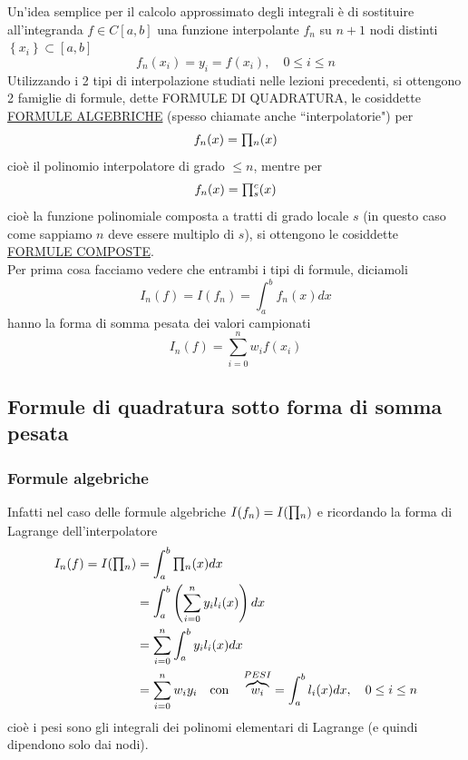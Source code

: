 Un'idea semplice per il calcolo approssimato degli integrali è di sostituire all'integranda $f \in C[a,b]$ una funzione interpolante $f_n$ su $n+1$ nodi distinti $\left\{x_i\right\} \subset [a,b]$
\begin{equation*}
    f_n(x_i) = y_i = f(x_i), \quad 0 \leq i \leq n
\end{equation*}
Utilizzando i 2 tipi di interpolazione studiati nelle lezioni precedenti, si ottengono 2 famiglie di formule, dette FORMULE DI QUADRATURA, le cosiddette \uline{FORMULE ALGEBRICHE} (spesso chiamate anche ``interpolatorie") per
\begin{equation*}
    f_n(x) = \begin{matrix}\prod\end{matrix}_n(x)
\end{equation*}
cioè il polinomio interpolatore di grado $\leq n$, mentre per 
\begin{equation*}
    f_n(x) = \begin{matrix}\prod\end{matrix}_s^c(x)
\end{equation*}
cioè la funzione polinomiale composta a tratti di grado locale $s$ (in questo caso come sappiamo $n$ deve essere multiplo di $s$), si ottengono le cosiddette \uline{FORMULE COMPOSTE}. \\
Per prima cosa facciamo vedere che entrambi i tipi di formule, diciamoli
\begin{equation*}
    I_n(f) = I(f_n) = \int_a^b f_n(x) dx
\end{equation*}
hanno la forma di somma pesata dei valori campionati
\begin{equation*}
    I_n(f) = \sum_{i=0}^n w_i f(x_i)
\end{equation*}

\subsection{Formule di quadratura sotto forma di somma pesata}
\subsubsection{Formule algebriche}
Infatti nel caso delle formule algebriche $I(f_n)=I(\begin{matrix}\prod\end{matrix}_n)$ e ricordando la forma di Lagrange dell'interpolatore
\begin{equation*}
    \begin{split}
        I_n(f) = I(\begin{matrix}\prod\end{matrix}_n) & = \int_a^b \begin{matrix}\prod\end{matrix}_n(x) dx \\
        & = \int_a^b \left(\sum_{i=0}^n y_i l_i(x)\right) dx \\
        & = \sum_{i=0}^n \int_a^b y_i l_i(x) dx \\
        & = \sum_{i=0}^n w_i y_i \quad \text{con} \quad \overbrace{w_i}^{PESI} = \int_a^b l_i(x) dx, \quad 0 \leq i \leq n
    \end{split}
\end{equation*}
cioè i pesi sono gli integrali dei polinomi elementari di Lagrange (e quindi dipendono solo dai nodi).

